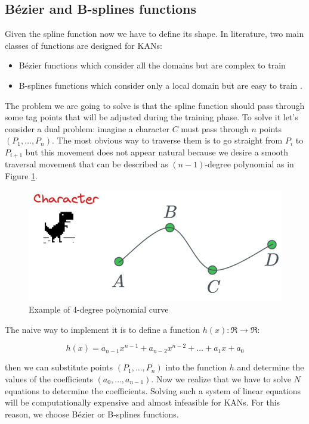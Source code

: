 \documentclass[12pt,a4paper]{article}
\begin{document}
\subsection{Bézier and B-splines functions}
Given the spline function now we have to define its shape. In literature, two main classes of functions are designed for KANs:
\begin{itemize}
    \item Bézier functions which consider all the domains but are complex to train \cite{bezier}
    \item B-splines functions which consider only a local domain but are easy to train \cite{kan_intro}.
\end{itemize}

The problem we are going to solve is that the spline function should pass through some tag points that will be adjusted during the training phase. To solve it let's consider a dual problem: imagine a character $C$ must pass through $n$ points $(P_1, \dots,P_n)$. The most obvious way to traverse them is to go straight from $P_i$ to $P_{i+1}$ but this movement does not appear natural because we desire a smooth traversal movement that can be described as $(n-1)$-degree polynomial as in Figure \ref{fig:bezier}.  
\begin{figure}[H]
    \centering
    \includegraphics[width=0.5\linewidth]{Images/bezier.png}
    \caption{Example of 4-degree polynomial curve}
    \label{fig:bezier}
\end{figure}

The naive way to implement it is to define a function $h(x): \Re \to \Re$:

$$h(x) = a_{n-1}x^{n-1} + a_{n-2}x^{n-2} + \dots + a_1x +a_0 $$

then we can substitute points $(P_1, \dots,P_n)$ into the function $h$ and determine the values of the coefficients $(a_0, \dots,a_{n-1})$. Now we realize that we have to solve $N$ equations to determine the coefficients. Solving such a system of linear equations will be computationally expensive and almost infeasible for KANs. For this reason, we choose Bézier or B-splines functions.
\end{document}
